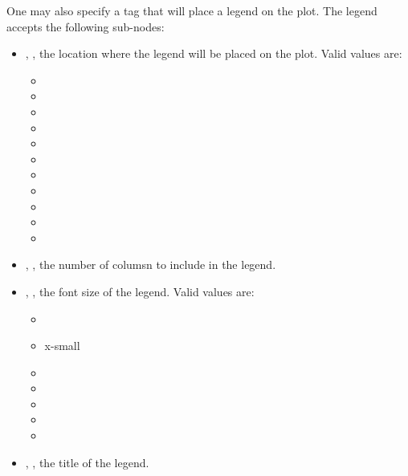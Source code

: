 One may also specify a  tag that will place a legend on the plot.
The legend accepts the following sub-nodes:

\begin{itemize}
  \item {}, , the location where the legend will be placed on the plot. Valid values are:
  \begin{itemize}
    \item {}
    \item {}
    \item {}
    \item {}
    \item {}
    \item {}
    \item {}
    \item {}
    \item {}
    \item {}
    \item {}
  \end{itemize}
  \item {}, , the number of columsn to include in the legend.
  \item {}, , the font size of the legend. Valid values are:
  \begin{itemize}
    \item {}
    \item x-small
    \item {}
    \item {}
    \item {}
    \item {}
    \item {}
  \end{itemize}
  \item {}, , the title of the legend.
\end{itemize}

